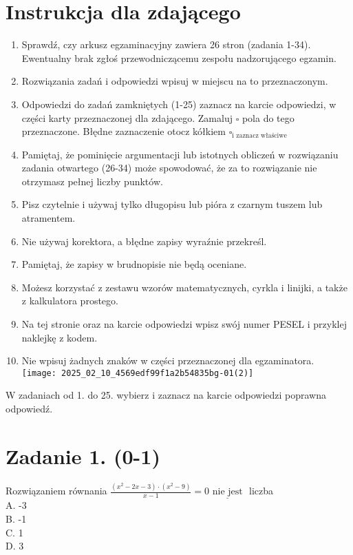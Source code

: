 \documentclass[10pt]{article}
\begin{document}
\section*{Instrukcja dla zdającego}
\begin{enumerate}
  \item Sprawdź, czy arkusz egzaminacyjny zawiera 26 stron (zadania 1-34). Ewentualny brak zgłoś przewodniczącemu zespołu nadzorującego egzamin.
  \item Rozwiązania zadań i odpowiedzi wpisuj w miejscu na to przeznaczonym.
  \item Odpowiedzi do zadań zamkniętych (1-25) zaznacz na karcie odpowiedzi, w części karty przeznaczonej dla zdającego. Zamaluj \(\square\) pola do tego przeznaczone. Błędne zaznaczenie otocz kółkiem \(\square_{\text {i zaznacz właściwe }}\)
  \item Pamiętaj, że pominięcie argumentacji lub istotnych obliczeń w rozwiązaniu zadania otwartego (26-34) może spowodować, że za to rozwiązanie nie otrzymasz pełnej liczby punktów.
  \item Pisz czytelnie i używaj tylko długopisu lub pióra z czarnym tuszem lub atramentem.
  \item Nie używaj korektora, a błędne zapisy wyraźnie przekreśl.
  \item Pamiętaj, że zapisy w brudnopisie nie będą oceniane.
  \item Możesz korzystać z zestawu wzorów matematycznych, cyrkla i linijki, a także z kalkulatora prostego.
  \item Na tej stronie oraz na karcie odpowiedzi wpisz swój numer PESEL i przyklej naklejkę z kodem.
  \item Nie wpisuj żadnych znaków w części przeznaczonej dla egzaminatora.\\
\texttt{[image: 2025\_02\_10\_4569edf99f1a2b54835bg-01(2)]}
\end{enumerate}

W zadaniach od 1. do 25. wybierz i zaznacz na karcie odpowiedzi poprawna odpowiedź.

\section*{Zadanie 1. (0-1)}
Rozwiązaniem równania \(\frac{\left(x^{2}-2 x-3\right) \cdot\left(x^{2}-9\right)}{x-1}=0 \underline{\text { nie jest }}\) liczba\\
A. -3\\
B. -1\\
C. 1\\
D. 3
\end{document}
